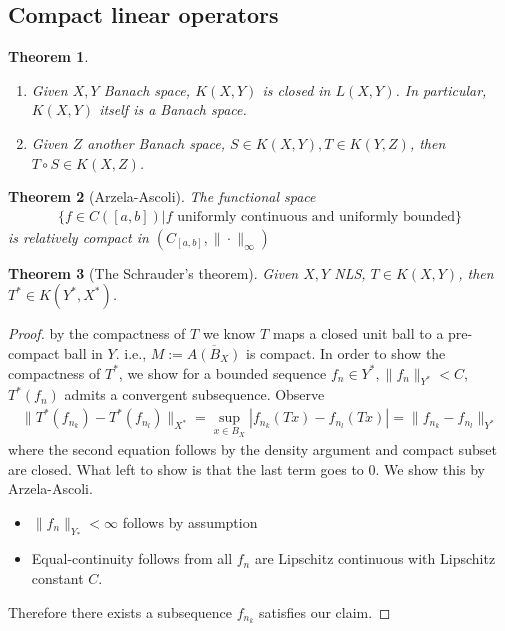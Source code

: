 \documentclass[a4paper,11pt,fleqn]{book}
\newtheorem{theorem}{Theorem}[section]
\theoremstyle{definition}
\theoremstyle{remark}
\begin{document}
\subsection{Compact linear operators}

\begin{theorem}\quad
\begin{enumerate}
	\item 	Given $X, Y$ Banach space, $K(X,Y)$ is closed in $L(X,Y)$. In particular, $K(X,Y)$ itself is a Banach space.
	\item Given $Z$ another Banach space, $S\in K(X, Y), T\in K(Y, Z)$, then $T \circ S \in K(X, Z)$. 
\end{enumerate}
\end{theorem}

\begin{theorem}[Arzela-Ascoli]
 The functional space
 \begin{align*}
 	\bigg\{f \in C([a, b]) | f \text{ uniformly continuous and uniformly bounded} \bigg\}
 \end{align*} 
 is relatively compact in $(C_{[a, b]}, \|\cdot\|_\infty)$ 
 \end{theorem}
 
 \begin{theorem}[The Schrauder's theorem]
	Given $X, Y$ NLS, $T \in K(X, Y)$, then $T^* \in K(Y^*, X^*)$.
\end{theorem}
\begin{proof}
	by the compactness of $T$ we know $T$ maps a closed unit ball to a pre-compact ball in $Y$. i.e., $M:= \overline{A(B_X)}$ is compact. In order to show the compactness of $T^*$, we show for a  bounded sequence $f_n \in Y^*, \|f_n\|_{Y^*}< C$, $T^*(f_n)$ admits a convergent subsequence. Observe 
	\begin{align*}
		\|T^*(f_{n_k}) - T^*(f_{n_l})\|_{X^*} = \sup_{x \in B_X} |f_{n_k}(Tx) - f_{n_l}(Tx)| = \|f_{n_k} - f_{n_l}\|_{Y^*}
	\end{align*}
	where the second equation follows by the density argument and compact subset are closed. What left to show is that the last term goes to 0. We show this by Arzela-Ascoli.
	\begin{itemize}
		\item $\|f_n\|_{Y_*}< \infty$ follows by assumption
		\item Equal-continuity follows from all $f_n$ are Lipschitz continuous with Lipschitz constant $C$.
	\end{itemize}
	Therefore there exists a subsequence $f_{n_k}$ satisfies our claim.
\end{proof}
\end{document}
